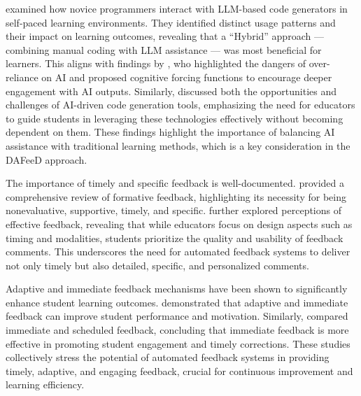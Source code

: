 \documentclass[manuscript,screen,review, anonymous]{acmart}
\begin{document}
%
%
\citet{kazemitabaar:2024:HowNovicesUse} examined how novice programmers interact with LLM-based code generators in self-paced learning environments. 
They identified distinct usage patterns and their impact on learning outcomes, revealing that a ``Hybrid'' approach — combining manual coding with LLM assistance — was most beneficial for learners. 
This aligns with findings by \citet{bucinca:2021:TrustThinkCognitive}, who highlighted the dangers of over-reliance on AI and proposed cognitive forcing functions to encourage deeper engagement with AI outputs. 
Similarly, \citet{becker:2023:ProgrammingHardLeast} discussed both the opportunities and challenges of AI-driven code generation tools, emphasizing the need for educators to guide students in leveraging these technologies effectively without becoming dependent on them. 
These findings highlight the importance of balancing AI assistance with traditional learning methods, which is a key consideration in the DAFeeD approach.


%
The importance of timely and specific feedback is well-documented.
\citet{shute:2008:FocusFormativeFeedback} provided a comprehensive review of formative feedback, highlighting its necessity for being nonevaluative, supportive, timely, and specific.
\citet{dawson:2019:WhatMakesEffective} further explored perceptions of effective feedback, revealing that while educators focus on design aspects such as timing and modalities, students prioritize the quality and usability of feedback comments.
This underscores the need for automated feedback systems to deliver not only timely but also detailed, specific, and personalized comments.


%
Adaptive and immediate feedback mechanisms have been shown to significantly enhance student learning outcomes.
\citet{marwan:2020:AdaptiveImmediateFeedback} demonstrated that adaptive and immediate feedback can improve student performance and motivation.
Similarly, \citet{leinonen:2022:ComparisonImmediateScheduled} compared immediate and scheduled feedback, concluding that immediate feedback is more effective in promoting student engagement and timely corrections.
These studies collectively stress the potential of automated feedback systems in providing timely, adaptive, and engaging feedback, crucial for continuous improvement and learning efficiency.
\end{document}

